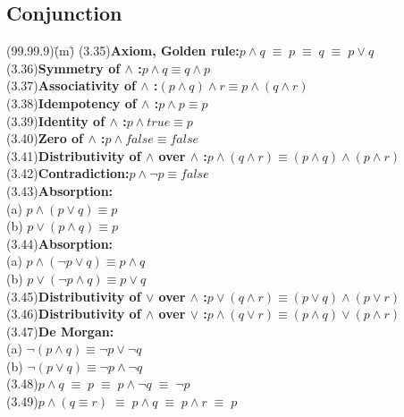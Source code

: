 \documentclass[fleqn, leqno]{article}
\newcommand{\lgap}{2pt}                             %
\newcommand{\equivs}{\ensuremath{\;\equiv\;}}       %
\begin{document}
\subsection*{Conjunction}
\begin{tabbing}
(99.99.9)\;\=(m)\;\=\kill
(3.35)\>\textbf{Axiom, Golden rule:}\quad $p\land q\equivs p\equivs q\equivs p\lor q$\\[\lgap]
(3.36)\>\textbf{Symmetry of $\land$ :}\quad $p\land q \equiv q\land p$\\[\lgap]
(3.37)\>\textbf{Associativity of $\land$ :}\quad $(p\land q) \land r\equiv p\land (q\land r)$\\[\lgap]
(3.38)\>\textbf{Idempotency of $\land$ :}\quad  $p\land p \equiv p$\\[\lgap]
(3.39)\>\textbf{Identity of $\land$ :}\quad $p\land true\equiv p$\\[\lgap]
(3.40)\>\textbf{Zero of $\land$ :}\quad $p\land false\equiv false$\\[\lgap]
(3.41)\>\textbf{Distributivity of $\land$ over $\land$ :}\quad $p\land (q\land r)\equiv (p\land q)\land (p\land r)$\\[\lgap]
(3.42)\>\textbf{Contradiction:}\quad $p \land \neg p \equiv false$\\[\lgap]
(3.43)\>\textbf{Absorption:}\\
      \> (a)\> $p \land (p \lor q) \equiv p$\\[\lgap]
      \> (b)\> $p \lor (p \land q) \equiv p$\\[\lgap]
(3.44)\>\textbf{Absorption:}\\
      \> (a)\> $p \land (\neg p \lor q) \equiv p \land q$\\[\lgap]
      \> (b)\> $p \lor (\neg p \land q) \equiv p \lor q$\\[\lgap]
(3.45)\>\textbf{Distributivity of $\lor$ over $\land$ :}\quad $p\lor (q\land r)\equiv (p\lor q)\land (p\lor r)$\\[\lgap]
(3.46)\>\textbf{Distributivity of $\land$ over $\lor$ :}\quad $p\land (q\lor r)\equiv (p\land q)\lor (p\land r)$\\[\lgap]
(3.47)\>\textbf{De Morgan:}\\
      \> (a)\> $\neg (p \land q) \equiv \neg p \lor \neg q$\\[\lgap]
      \> (b)\> $\neg (p \lor q) \equiv \neg p \land \neg q$\\[\lgap]
(3.48)\>$p\land q\equivs p\equivs p\land \neg q\equivs \neg p$\\[\lgap]
(3.49)\>$p\land (q\equiv r)\equivs p\land q\equivs p\land r \equivs p$\\[\lgap]

\end{tabbing}
\end{document}

